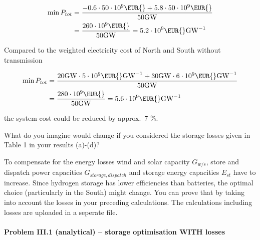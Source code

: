 \documentclass[11pt,a4paper,fleqn]{scrartcl}
\newcommand{\eur}{\text{\EUR{}}}
\begin{document}
\begin{enumerate}[(a)]
\begin{align*}
\min P_{tot} & = \frac{-0.6 \cdot 50 \cdot 10^9 \eur + 5.8 \cdot 50 \cdot 10^9 \eur}{50 \si{\giga\watt}}  \\
& = \frac{260 \cdot 10^9 \eur}{50 \si{\giga\watt}} = 5.2 \cdot 10^9 \eur \si{\per\giga\watt}
\end{align*}

Compared to the weighted electricity cost of North and South without transmission

\begin{align*}
\min P_{tot} & = \frac{20\si{\giga\watt}\cdot 5 \cdot 10^9 \eur \si{\per\giga\watt} + 30\si{\giga\watt}\cdot 6 \cdot 10^9 \eur \si{\per\giga\watt}}{50 \si{\giga\watt}} \\
& = \frac{280 \cdot 10^9 \eur}{50 \si{\giga\watt}} = 5.6 \cdot 10^9 \eur \si{\per\giga\watt}
\end{align*}

the system cost could be reduced by approx.\ 7 \%.


  \begin{shaded}
 	\item What do you imagine would change if you considered the storage losses given in Table 1 in your results (a)-(d)?
 \end{shaded}
 
 To compensate for the energy losses wind and solar capacity $G_{w/s}$, store and dispatch power capacities $G_{storage,dispatch}$ and storage energy capacities $E_{st}$ have to increase. Since hydrogen storage has lower efficiencies than batteries, the optimal choice (particularly in the South) might change. You can prove that by taking into account the losses in your preceding calculations. The calculations including losses are uploaded in a seperate file.
 
\noindent\paragraph{Problem III.1 (analytical) -- storage optimisation WITH losses}~\\
 


\end{enumerate}
\end{document}
